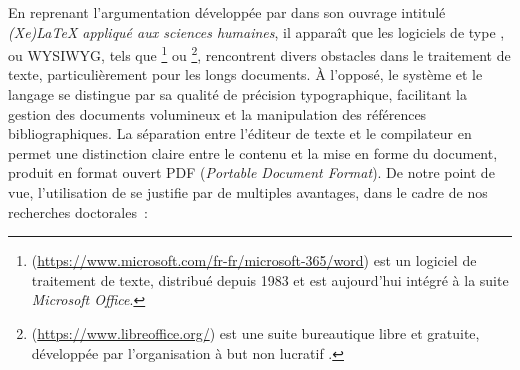 En reprenant l'argumentation développée par \textcolor{blue}{\textcite[8-9]{rouquette_xelatex_2012}} dans son ouvrage intitulé \textsl{(Xe)LaTeX appliqué aux sciences humaines}, il apparaît que les logiciels de type , ou \acrfull{WYSIWYG}, tels que \footnote{
 (\url{https://www.microsoft.com/fr-fr/microsoft-365/word}) est un logiciel de traitement de texte, distribué depuis 1983 et est aujourd'hui intégré à la suite \textsl{Microsoft Office}.
} ou \footnote{
 (\url{https://www.libreoffice.org/}) est une suite bureautique libre et gratuite, développée par l'organisation à but non lucratif .
}, rencontrent divers obstacles dans le traitement de texte, particulièrement pour les longs documents. À l'opposé, le système et le langage \latexword{\LaTeX} se distingue par sa qualité de précision typographique, facilitant la gestion des documents volumineux et la manipulation des références bibliographiques. La séparation entre l'éditeur de texte et le compilateur en \latexword{\LaTeX} permet une distinction claire entre le contenu et la mise en forme du document, produit en format ouvert PDF (\textsl{Portable Document Format}). De notre point de vue, l'utilisation de \latexword{\LaTeX} se justifie par de multiples avantages, dans le cadre de nos recherches doctorales~:
